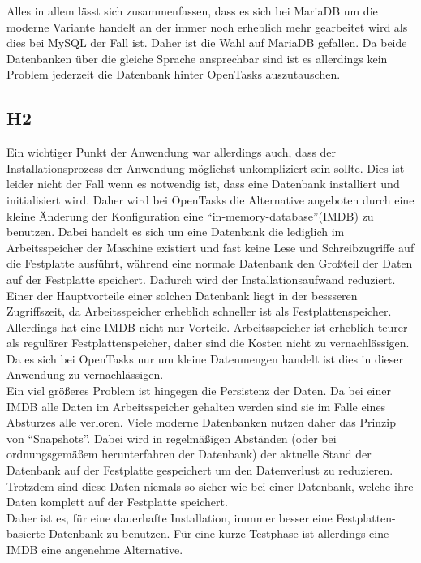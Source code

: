 Alles in allem lässt sich zusammenfassen, dass es sich bei MariaDB um die moderne Variante handelt an der immer noch erheblich mehr gearbeitet wird als dies bei MySQL der Fall ist. Daher ist die Wahl auf MariaDB gefallen. Da beide Datenbanken über die gleiche Sprache ansprechbar sind ist es allerdings kein Problem jederzeit die Datenbank hinter OpenTasks auszutauschen.

\subsection{H2}

Ein wichtiger Punkt der Anwendung war allerdings auch, dass der Installationsprozess der Anwendung möglichst unkompliziert sein sollte. Dies ist leider nicht der Fall wenn es notwendig ist, dass eine Datenbank installiert und initialisiert wird. Daher wird bei OpenTasks die Alternative angeboten durch eine kleine Änderung der Konfiguration eine ``in-memory-database''(IMDB) zu benutzen. Dabei handelt es sich um eine Datenbank die lediglich im Arbeitsspeicher der Maschine existiert und fast keine Lese und Schreibzugriffe auf die Festplatte ausführt, während eine normale Datenbank den Großteil der Daten auf der Festplatte speichert. Dadurch wird der Installationsaufwand reduziert. \\

Einer der Hauptvorteile einer solchen Datenbank liegt in der bessseren Zugriffszeit, da Arbeitsspeicher erheblich schneller ist als Festplattenspeicher. Allerdings hat eine IMDB nicht nur Vorteile. Arbeitsspeicher ist erheblich teurer als regulärer Festplattenspeicher, daher sind die Kosten nicht zu vernachlässigen. Da es sich bei OpenTasks nur um kleine Datenmengen handelt ist dies in dieser Anwendung zu vernachlässigen. \\
Ein viel größeres Problem ist hingegen die Persistenz der Daten. Da bei einer IMDB alle Daten im Arbeitsspeicher gehalten werden sind sie im Falle eines Absturzes alle verloren. Viele moderne Datenbanken nutzen daher das Prinzip von ``Snapshots''. Dabei wird in regelmäßigen Abständen (oder bei ordnungsgemäßem herunterfahren der Datenbank) der aktuelle Stand der Datenbank auf der Festplatte gespeichert um den Datenverlust zu reduzieren. Trotzdem sind diese Daten niemals so sicher wie bei einer Datenbank, welche ihre Daten komplett auf der Festplatte speichert. \\

Daher ist es, für eine dauerhafte Installation, immmer besser eine Festplatten-basierte Datenbank zu benutzen. Für eine kurze Testphase ist allerdings eine IMDB eine angenehme Alternative.

